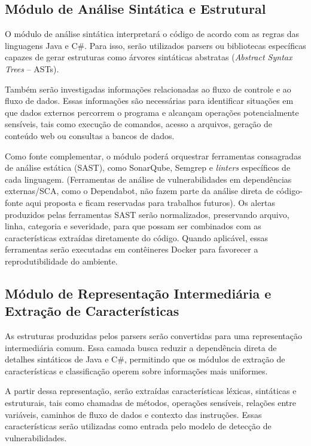 \subsection{Módulo de Análise Sintática e Estrutural}

O módulo de análise sintática interpretará o código de acordo com as regras
das linguagens Java e C\#. Para isso, serão utilizados parsers ou
bibliotecas específicas capazes de gerar estruturas como árvores sintáticas
abstratas (\textit{Abstract Syntax Trees} -- ASTs).

Também serão investigadas informações relacionadas ao fluxo de controle e
ao fluxo de dados. Essas informações são necessárias para identificar
situações em que dados externos percorrem o programa e alcançam operações
potencialmente sensíveis, tais como execução de comandos, acesso a
arquivos, geração de conteúdo web ou consultas a bancos de dados.

Como fonte complementar, o módulo poderá orquestrar ferramentas consagradas de análise
estática (SAST), como SonarQube, Semgrep e \textit{linters} específicos de cada linguagem. (Ferramentas de análise de vulnerabilidades em dependências externas/SCA, como o Dependabot, não fazem parte da análise direta de código-fonte aqui proposta e ficam reservadas para trabalhos futuros). Os alertas produzidos pelas ferramentas SAST serão normalizados, preservando arquivo,
linha, categoria e severidade, para que possam ser combinados com as
características extraídas diretamente do código. Quando aplicável, essas
ferramentas serão executadas em contêineres Docker para favorecer a
reprodutibilidade do ambiente.

\subsection{Módulo de Representação Intermediária e Extração de Características}

As estruturas produzidas pelos parsers serão convertidas para uma
representação intermediária comum. Essa camada busca reduzir a dependência
direta de detalhes sintáticos de Java e C\#, permitindo que os módulos de
extração de características e classificação operem sobre informações mais
uniformes.

A partir dessa representação, serão extraídas características léxicas,
sintáticas e estruturais, tais como chamadas de métodos, operações
sensíveis, relações entre variáveis, caminhos de fluxo de dados e contexto
das instruções. Essas características serão utilizadas como entrada pelo
modelo de detecção de vulnerabilidades.

